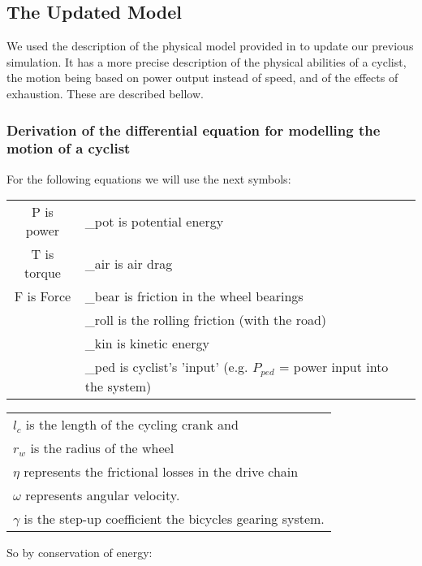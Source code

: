 \documentclass[10pt, a4paper]{report}
\begin{document}
\subsection{The Updated Model}\label{subsec:updmodel}

We used the description of the physical model provided in \cite{MathModel} to update our previous simulation. It has a more precise description of the physical abilities of a cyclist, the motion being based on power output instead of speed, and of the effects of exhaustion. These are described bellow.

\subsubsection{Derivation of the differential equation for modelling the motion of a cyclist}

For the following equations we will use the next symbols: \\

\begin{tabularx}{\linewidth}{|c|X|}
\hline
P is power	&	\_pot is potential energy	\\
T is torque	&	\_air is air drag			\\
F is Force 	&  	\_bear is friction in the wheel bearings \\
			& 	\_roll is the rolling friction (with the road) \\
			& 	\_kin is kinetic energy \\
			&	\_ped is cyclist's 'input' (e.g. $P_{ped}$ = power input into the system) \\
\hline
\end{tabularx}

\begin{tabularx}{\linewidth}{|X|}

$l_{c}$  is the length of the cycling crank and \\
$r_{w}$  is the radius of the wheel \\
$\eta$ 		represents the frictional losses in the drive chain \\
$\omega$ 	represents angular velocity.\\
$\gamma$	is the step-up coefficient the bicycles gearing system.  \\
\hline
\end{tabularx}

\vspace{1cm}
So by conservation of energy:
\end{document}
